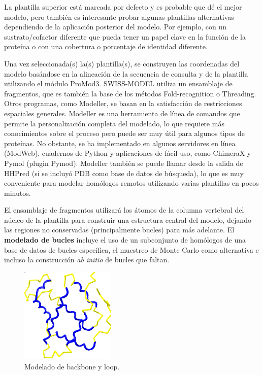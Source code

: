 La plantilla superior está marcada por defecto y es probable que dé el mejor modelo, pero también es interesante probar algunas plantillas alternativas dependiendo de la aplicación posterior del modelo. Por ejemplo, con un sustrato/cofactor diferente que pueda tener un papel clave en la función de la proteína o con una cobertura o porcentaje de identidad diferente.

Una vez seleccionada(s) la(s) plantilla(s), se construyen las coordenadas del modelo basándose en la alineación de la secuencia de consulta y de la plantilla utilizando el módulo ProMod3. SWISS-MODEL utiliza un ensamblaje de fragmentos, que es también la base de los métodos Fold-recognition o Threading. Otros programas, como Modeller, se basan en la satisfacción de restricciones espaciales generales. Modeller es una herramienta de línea de comandos que permite la personalización completa del modelado, lo que requiere más conocimientos sobre el proceso pero puede ser muy útil para algunos tipos de proteínas. No obstante, se ha implementado en algunos servidores en línea (ModWeb), cuadernos de Python y aplicaciones de fácil uso, como ChimeraX y Pymol (plugin Pymod). Modeller también se puede llamar desde la salida de HHPred (si se incluyó PDB como base de datos de búsqueda), lo que es muy conveniente para modelar homólogos remotos utilizando varias plantillas en pocos minutos.

El ensamblaje de fragmentos utilizará los átomos de la columna vertebral del núcleo de la plantilla para construir una estructura central del modelo, dejando las regiones no conservadas (principalmente bucles) para más adelante. El \textbf{modelado de bucles} incluye el uso de un subconjunto de homólogos de una base de datos de bucles específica, el muestreo de Monte Carlo como alternativa e incluso la construcción \textit{ab initio} de bucles que faltan.

\begin{figure}[h]
\centering
\includegraphics[width = 0.4\textwidth]{figs/loops.png}
\caption{Modelado de backbone y loop.}
\end{figure}

